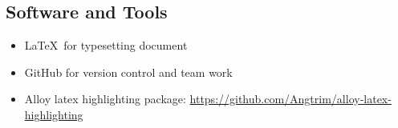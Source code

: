 \subsection{Software and Tools}
\begin{itemize}
\item
	\LaTeX\ for typesetting document
\item
	GitHub for version control and team work
\item
	Alloy latex highlighting package: \href{https://github.com/Angtrim/alloy-latex-highlighting}{https://github.com/Angtrim/alloy-latex-highlighting}
\end{itemize}